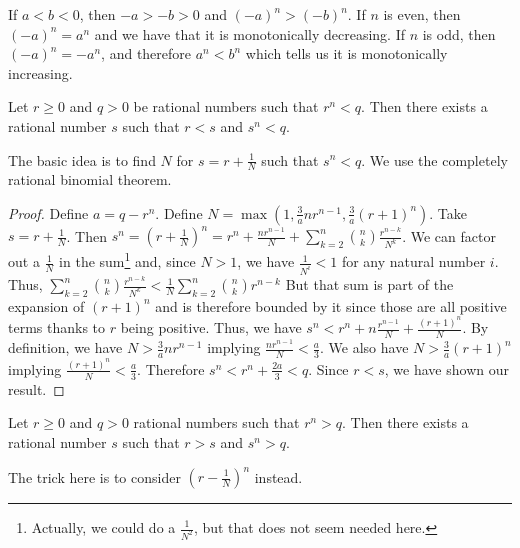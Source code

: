 \documentclass[12pt]{article}
\begin{document}
If $ a< b< 0$, then $-a > -b > 0$ and $(-a)^n > (-b)^n$. If $n$ is even, then $(-a)^n = a^n$ and we have that it is monotonically decreasing. If $n$ is odd, then $(-a)^n = -a^n$, and therefore $a^n < b^n$ which tells us it is monotonically increasing. 

\begin{lemma}\label{app:lesser}
Let $r \geq 0 $ and $q > 0$ be rational numbers such that $r^n < q$. Then there exists a rational number $s$ such that $r < s$ and $s^n < q$.
\end{lemma}

The basic idea is to find $N$ for $s = r + \tfrac{1}{N}$ such that $s^n < q$. We use the completely rational binomial theorem.  

\begin{proof}
Define $a = q - r^n$. Define $N =  \max(1,\tfrac{3}{a}n r^{n-1}, \tfrac{3}{a}(r+1)^n)$.  Take $s = r + \tfrac{1}{N}$. Then $s^n = (r+ \tfrac{1}{N})^n = r^n + \tfrac{n r^{n-1}}{N} + \sum_{k=2}^{n} \binom{n}{k} \tfrac{r^{n-k}}{N^k}$. We can factor out a $\tfrac{1}{N}$ in the sum\footnote{Actually, we could do a $\frac{1}{N^2}$, but that does not seem needed here.} and, since $N > 1$, we have $\tfrac{1}{N^i} < 1$ for any natural number $i$. Thus, $\sum_{k=2}^{n} \binom{n}{k} \tfrac{r^{n-k}}{N^k} < \tfrac{1}{N} \sum_{k=2}^{n} \binom{n}{k} r^{n-k}$  But that sum is part of the expansion of $(r+1)^n$ and is therefore bounded by it since those are all positive terms thanks to $r$ being positive. Thus, we have $s^n < r^n + n \tfrac{r^{n-1}}{N} + \tfrac{ (r+1)^n }{N}$.  By definition, we have $N > \tfrac{3}{a} n r^{n-1}$ implying $\tfrac{ n r^{n-1}}{N} < \tfrac{a}{3}$. We also have $N > \tfrac{3}{a} (r+1)^n$ implying $ \tfrac{(r+1)^n}{N} < \tfrac{a}{3}$. Therefore $s^n < r^n + \tfrac{2 a}{3} < q$. Since $r<s$, we have shown our result. 
\end{proof}

\begin{lemma}\label{app:greater}
Let $r \geq 0 $ and $q > 0$ rational numbers such that $r^n > q$. Then there exists a rational number $s$ such that $r > s$ and $s^n > q$.
\end{lemma}

The trick here is to consider $(r-\tfrac{1}{N})^n$ instead. 
\end{document}
